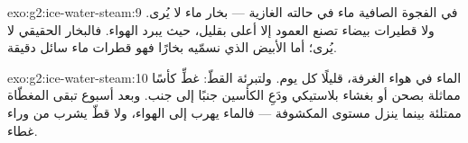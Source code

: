 \begin{solution}{exo:g2:ice-water-steam:9}
في الفجوة الصافية ماء في حالته الغازية --- بخار ماء لا يُرى.
ولا  قطيرات بيضاء تصنع العمود إلا أعلى بقليل، حيث يبرد
الهواء. فالبخار الحقيقي لا يُرى؛ أما الأبيض الذي نسمّيه بخارًا
فهو قطرات ماء سائل دقيقة.
\end{solution}

\begin{solution}{exo:g2:ice-water-steam:10}
 الماء في هواء الغرفة، قليلًا كل يوم. ولتبرئة القطّ: غطِّ
كأسًا مماثلة بصحن أو بغشاء بلاستيكي ودَعِ الكأسين جنبًا إلى
جنب. وبعد أسبوع تبقى المغطّاة ممتلئة بينما ينزل مستوى المكشوفة
--- فالماء يهرب إلى الهواء، ولا قطّ يشرب من وراء غطاء.
\end{solution}
